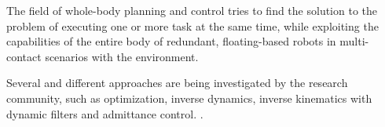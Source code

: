 \def\q{\mathbf{q}}
\def\dq{\mathbf{\dot{q}}}
\def\J{\mathbf{J}}
\def\A{\mathbf{A}}
\def\B{\mathcal{B}}
\def\C{\mathcal{C}}
\def\T{\mathcal{T}}
\def\W{\mathbf{W}}
\def\b{\mathbf{b}}
\def\I{\mathbf{I}}
\def\x{\mathbf{x}}
\def\dx{\mathbf{\dot{x}}}
\def\e{\mathbf{e}}
\def\de{\mathbf{\dot{e}}}
\def\w{\mathbf{w}}

The field of whole-body planning and control tries to find the solution to the problem of executing one or more task at the same time, while exploiting the capabilities of the entire body of redundant, floating-based robots in multi-contact scenarios with the environment.


Several and different approaches are being investigated by the research community, such as optimization, inverse dynamics, inverse kinematics with dynamic filters and admittance control. .

